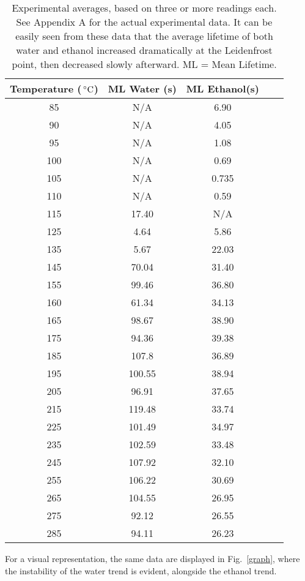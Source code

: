 \documentclass[aps,pre,twocolumn,nofootinbib]{revtex4}
\begin{document}
\begin{table}[h]
	\caption{Experimental averages, based on three or more readings each.  See Appendix A for the actual experimental data.  It can be easily seen from these data that the average lifetime of both water and ethanol increased dramatically at the Leidenfrost point, then decreased slowly afterward. ML = Mean Lifetime.}
\begin{ruledtabular}
	\begin{tabular}{ccccc} 
	
	Temperature ($\,^{\circ}{\rm C}$) & ML Water (s) & ML Ethanol(s)\\  \hline
	85 & N/A & 6.90\\
	90 & N/A & 4.05\\
	95 & N/A & 1.08\\
	100 & N/A & 0.69\\
	105 & N/A & 0.735\\
	110 & N/A & 0.59\\
	115 & 17.40 & N/A\\
	125 & 4.64 & 5.86\\
	135 & 5.67 & 22.03\\
	145 & 70.04 & 31.40\\
	155 & 99.46 & 36.80\\
	160 & 61.34 & 34.13\\
	165 & 98.67 & 38.90\\
	175 & 94.36 & 39.38\\
	185 & 107.8 & 36.89\\
	195 & 100.55 & 38.94\\
	205 & 96.91 & 37.65\\
	215 & 119.48 & 33.74\\
	225 & 101.49 & 34.97\\
	235 & 102.59 & 33.48\\
	245 & 107.92 & 32.10\\
	255 & 106.22 & 30.69\\
	265 & 104.55 & 26.95\\
	275 & 92.12 & 26.55\\
	285 & 94.11 & 26.23\\
	\end{tabular}
	\end{ruledtabular}
	\label{data}
\end{table}

For a visual representation, the same data are displayed in Fig.~\ref{graph}, where the instability of the water trend is evident, alongside the ethanol trend.
\end{document}
